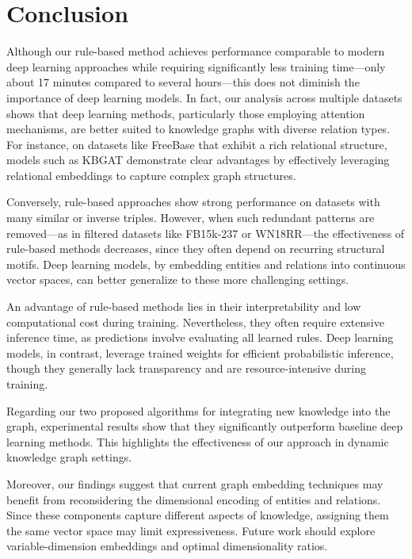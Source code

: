 \section{Conclusion}
\label{chap:Conclusion}

Although our rule-based method achieves performance comparable to modern deep learning approaches while requiring significantly less training time—only about 17 minutes compared to several hours—this does not diminish the importance of deep learning models. In fact, our analysis across multiple datasets shows that deep learning methods, particularly those employing attention mechanisms, are better suited to knowledge graphs with diverse relation types. For instance, on datasets like FreeBase that exhibit a rich relational structure, models such as KBGAT demonstrate clear advantages by effectively leveraging relational embeddings to capture complex graph structures.

Conversely, rule-based approaches show strong performance on datasets with many similar or inverse triples. However, when such redundant patterns are removed—as in filtered datasets like FB15k-237 or WN18RR—the effectiveness of rule-based methods decreases, since they often depend on recurring structural motifs. Deep learning models, by embedding entities and relations into continuous vector spaces, can better generalize to these more challenging settings.

An advantage of rule-based methods lies in their interpretability and low computational cost during training. Nevertheless, they often require extensive inference time, as predictions involve evaluating all learned rules. Deep learning models, in contrast, leverage trained weights for efficient probabilistic inference, though they generally lack transparency and are resource-intensive during training.

Regarding our two proposed algorithms for integrating new knowledge into the graph, experimental results show that they significantly outperform baseline deep learning methods. This highlights the effectiveness of our approach in dynamic knowledge graph settings.

Moreover, our findings suggest that current graph embedding techniques may benefit from reconsidering the dimensional encoding of entities and relations. Since these components capture different aspects of knowledge, assigning them the same vector space may limit expressiveness. Future work should explore variable-dimension embeddings and optimal dimensionality ratios.

